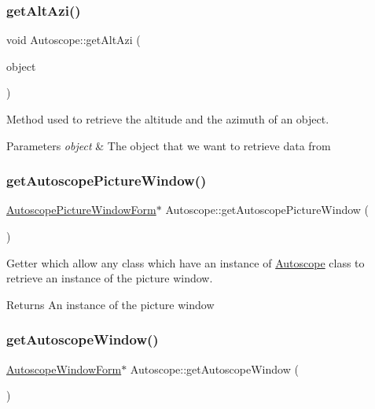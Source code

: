 \subsubsection{\texorpdfstring{getAltAzi()}{getAltAzi()}}
{\footnotesize\ttfamily void Autoscope\+::get\+Alt\+Azi (\begin{DoxyParamCaption}\item[{Stel\+ObjectP}]{object }\end{DoxyParamCaption})}



Method used to retrieve the altitude and the azimuth of an object. 


\begin{DoxyParams}{Parameters}
{\em object} & The object that we want to retrieve data from \\
\hline
\end{DoxyParams}
\mbox{\label{class_autoscope_a78d970ac013a0640bc28cac027737848}} 
\subsubsection{\texorpdfstring{getAutoscopePictureWindow()}{getAutoscopePictureWindow()}}
{\footnotesize\ttfamily \mbox{\hyperlink{class_autoscope_picture_window_form}{Autoscope\+Picture\+Window\+Form}}$\ast$ Autoscope\+::get\+Autoscope\+Picture\+Window (\begin{DoxyParamCaption}\item[{void}]{ }\end{DoxyParamCaption})\hspace{0.3cm}{\ttfamily [inline]}}



Getter which allow any class which have an instance of \mbox{\hyperlink{class_autoscope}{Autoscope}} class to retrieve an instance of the picture window. 

\begin{DoxyReturn}{Returns}
An instance of the picture window 
\end{DoxyReturn}
\mbox{\label{class_autoscope_aad8f888c886f1f3e36878e8c3e658813}} 
\subsubsection{\texorpdfstring{getAutoscopeWindow()}{getAutoscopeWindow()}}
{\footnotesize\ttfamily \mbox{\hyperlink{class_autoscope_window_form}{Autoscope\+Window\+Form}}$\ast$ Autoscope\+::get\+Autoscope\+Window (\begin{DoxyParamCaption}\item[{void}]{ }\end{DoxyParamCaption})\hspace{0.3cm}{\ttfamily [inline]}}



